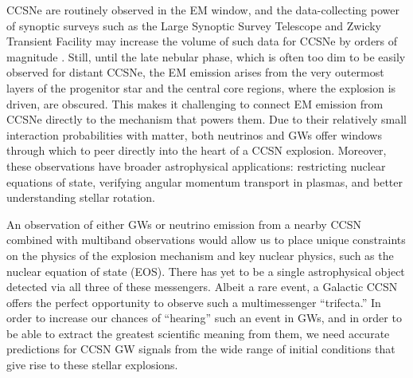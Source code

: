 \documentclass[twocolumn,times]{aastex62}  %
\begin{document}
CCSNe are routinely observed in the EM window, and the data-collecting power of synoptic surveys such as the Large Synoptic Survey Telescope and Zwicky Transient Facility may increase the volume of such data for CCSNe by orders of magnitude \citep{ivezic:2019,bellm:2019}.
Still, until the late nebular phase, which is often too dim to be easily observed for distant CCSNe, the EM emission arises from the very outermost layers of the progenitor star and the central core regions, where the explosion is driven, are obscured. 
This makes it challenging to connect EM emission from CCSNe directly to the mechanism that powers them.
Due to their relatively small interaction probabilities with matter, both neutrinos and GWs offer windows through which to peer directly into the heart of a CCSN explosion.  
Moreover, these observations have broader astrophysical applications: restricting nuclear equations of state, verifying angular momentum transport in plasmas, and better understanding stellar rotation.

An observation of either GWs or neutrino emission from a nearby CCSN combined with multiband observations would allow us to place unique constraints on the physics of the explosion mechanism and key nuclear physics, such as the nuclear equation of state (EOS).  
There has yet to be a single astrophysical object detected via all three of these messengers.  
Albeit a rare event, a Galactic CCSN offers the perfect opportunity to observe such a multimessenger ``trifecta.''  
In order to increase our chances of ``hearing'' such an event in GWs, and in order to be able to extract the greatest scientific meaning from them, we need accurate predictions for CCSN GW signals from the wide range of initial conditions that give rise to these stellar explosions.
\end{document}
